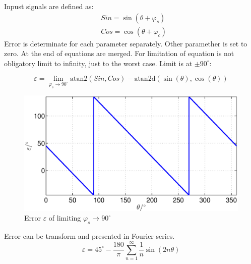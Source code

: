 \documentclass[a4paper]{article}
\begin{document}
Inpust signals are defined as:
\begin{eqnarray}
\label{equ:def_sin_fis}
&Sin = \sin(\theta + \varphi_{s})\\
\label{equ:def_cos_fis}
&Cos =\cos(\theta+\varphi_{c})
\end{eqnarray}
Error is determinate for each parameter separately. Other paramether is set to zero. At the end of equations are merged. For limitation of equation is not obligatory limit to infinity, just to the worst case. Limit is at $\pm 90^\circ$:

\begin{equation}
\label{equ:fis_lim}
\varepsilon = \lim_{\varphi_{s} \rightarrow 90^\circ} \mathrm{atan2}(Sin ,Cos)- \mathrm{atan2d}(\sin(\theta),\cos(\theta))
\end{equation}
\begin{figure}[!htb]
    \begin{center}
        \includegraphics[width=\linewidth]{./Slike/lim_sinfaza.eps}
        \caption{Error $\varepsilon$ of limiting $\varphi_{s} \rightarrow 90^\circ$} \label{fig:lim_sin_fis}
    \end{center}
\end{figure}
Error can be transform and presented in Fourier series.
\begin{equation}
\label{equ:lim_fis_vrsta}
\varepsilon = 45^\circ - \frac{180}{\pi}\sum_{n=1}^{\infty}\frac{1}{n} \sin (2n \theta)
\end{equation}
\end{document}
